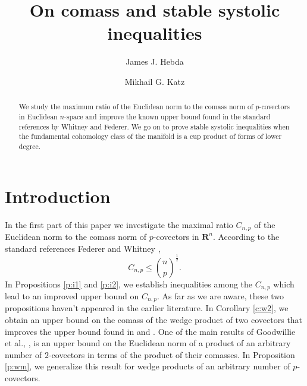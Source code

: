 \documentclass[12pt]{amsart}
\theoremstyle{definition}
\theoremstyle{remark}
\numberwithin{equation}{section}
\begin{document}
  
  
\title[] 
 {On  comass  and  stable systolic inequalities}

\author{James J. Hebda }
\address{Department of Mathematics and Statistics, Saint Louis University, St. Louis, MO 63103}

 
 \author{Mikhail G. Katz}
\address{ Department of Mathematics, Bar Ilan University, Ramat Gan 52900 Israel}







                                       





\maketitle

\begin{abstract}
We study the maximum ratio  of the Euclidean norm to the comass norm of $p$-covectors in Euclidean $n$-space  and improve the known upper bound found  in the standard references by Whitney and Federer.  We go on to prove stable systolic inequalities when the fundamental cohomology class of the manifold is a cup product of forms of lower degree.  

\end{abstract}

\section{Introduction}%

 In the first part of this paper we investigate the maximal ratio $C_{n,p}$  of the Euclidean norm to the comass norm of $p$-covectors in $\mathbf{R}^n$. 
 According to the standard references Federer \cite[1.81]{HF} and Whitney \cite[equation (18) p. 50]{HW},  
\begin{equation*}
 C_{n,p} \leq \binom{n}{p}^\frac 12.
\end{equation*}
In Propositions \ref{p:i1} and \ref{p:i2}, we establish 
 inequalities among the $C_{n,p}$  which lead to an improved upper bound on $C_{n,p}$. 
 As far as we are aware, these two propositions haven't appeared in the earlier literature.
 In Corollary \ref{c:w2}, we obtain an upper bound on the comass of the wedge product of two covectors that improves the upper bound found in  \cite[p. 39]{HF} and \cite[p. 55]{HW}. One of the main results of Goodwillie et al., \cite{GHK}, is an upper bound on the Euclidean  norm of a product of an arbitrary number of $2$-covectors in terms of the product of their comasses. In  Proposition \ref{p:wm}, we generalize this result for wedge products of an arbitrary number of $p$-covectors.
 
\end{document}
